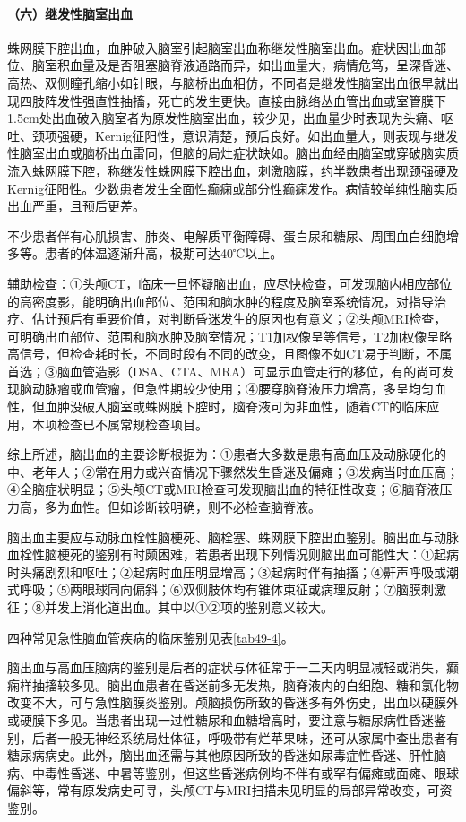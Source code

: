 \paragraph{（六）继发性脑室出血}

蛛网膜下腔出血，血肿破入脑室引起脑室出血称继发性脑室出血。症状因出血部位、脑室积血量及是否阻塞脑脊液通路而异，如出血量大，病情危笃，呈深昏迷、高热、双侧瞳孔缩小如针眼，与脑桥出血相仿，不同者是继发性脑室出血很早就出现四肢阵发性强直性抽搐，死亡的发生更快。直接由脉络丛血管出血或室管膜下1.5cm处出血破入脑室者为原发性脑室出血，较少见，出血量少时表现为头痛、呕吐、颈项强硬，Kernig征阳性，意识清楚，预后良好。如出血量大，则表现与继发性脑室出血或脑桥出血雷同，但脑的局灶症状缺如。脑出血经由脑室或穿破脑实质流入蛛网膜下腔，称继发性蛛网膜下腔出血，刺激脑膜，约半数患者出现颈强硬及Kernig征阳性。少数患者发生全面性癫痫或部分性癫痫发作。病情较单纯性脑实质出血严重，且预后更差。

不少患者伴有心肌损害、肺炎、电解质平衡障碍、蛋白尿和糖尿、周围血白细胞增多等。患者的体温逐渐升高，极期可达40℃以上。

辅助检查：①头颅CT，临床一旦怀疑脑出血，应尽快检查，可发现脑内相应部位的高密度影，能明确出血部位、范围和脑水肿的程度及脑室系统情况，对指导治疗、估计预后有重要价值，对判断昏迷发生的原因也有意义；②头颅MRI检查，可明确出血部位、范围和脑水肿及脑室情况；T1加权像呈等信号，T2加权像呈略高信号，但检查耗时长，不同时段有不同的改变，且图像不如CT易于判断，不属首选；③脑血管造影（DSA、CTA、MRA）可显示血管走行的移位，有的尚可发现脑动脉瘤或血管瘤，但急性期较少使用；④腰穿脑脊液压力增高，多呈均匀血性，但血肿没破入脑室或蛛网膜下腔时，脑脊液可为非血性，随着CT的临床应用，本项检查已不属常规检查项目。

综上所述，脑出血的主要诊断根据为：①患者大多数是患有高血压及动脉硬化的中、老年人；②常在用力或兴奋情况下骤然发生昏迷及偏瘫；③发病当时血压高；④全脑症状明显；⑤头颅CT或MRI检查可发现脑出血的特征性改变；⑥脑脊液压力高，多为血性。但如诊断较明确，则不必检查脑脊液。

脑出血主要应与动脉血栓性脑梗死、脑栓塞、蛛网膜下腔出血鉴别。脑出血与动脉血栓性脑梗死的鉴别有时颇困难，若患者出现下列情况则脑出血可能性大：①起病时头痛剧烈和呕吐；②起病时血压明显增高；③起病时伴有抽搐；④鼾声呼吸或潮式呼吸；⑤两眼球同向偏斜；⑥双侧肢体均有锥体束征或病理反射；⑦脑膜刺激征；⑧并发上消化道出血。其中以①②项的鉴别意义较大。

四种常见急性脑血管疾病的临床鉴别见表\ref{tab49-4}。

脑出血与高血压脑病的鉴别是后者的症状与体征常于一二天内明显减轻或消失，癫痫样抽搐较多见。脑出血患者在昏迷前多无发热，脑脊液内的白细胞、糖和氯化物改变不大，可与急性脑膜炎鉴别。颅脑损伤所致的昏迷多有外伤史，出血以硬膜外或硬膜下多见。当患者出现一过性糖尿和血糖增高时，要注意与糖尿病性昏迷鉴别，后者一般无神经系统局灶体征，呼吸带有烂苹果味，还可从家属中查出患者有糖尿病病史。此外，脑出血还需与其他原因所致的昏迷如尿毒症性昏迷、肝性脑病、中毒性昏迷、中暑等鉴别，但这些昏迷病例均不伴有或罕有偏瘫或面瘫、眼球偏斜等，常有原发病史可寻，头颅CT与MRI扫描未见明显的局部异常改变，可资鉴别。

